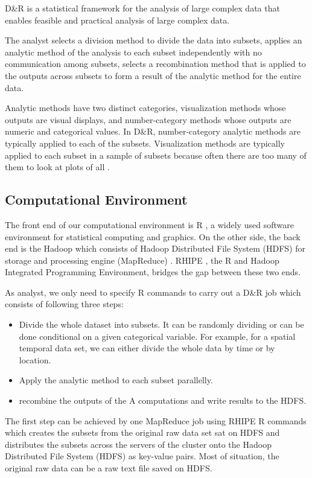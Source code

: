 D\&R \cite{Guha:2012} is a statistical framework for the analysis of large complex
data that enables feasible and practical analysis of large complex data. 

The 
analyst selects a division method to divide the data into subsets, applies an 
analytic method of the analysis to each subset independently with no communication
among subsets, selects a recombination method that is applied to the outputs 
across subsets to form a result of the analytic method for the entire data.

Analytic methods have two distinct categories, visualization methods whose outputs
are visual displays, and number-category methods whose outputs are numeric and 
categorical values. In D\&R, number-category analytic methods are typically applied
to each of the subsets. Visualization methods are typically applied to each subset 
in a sample of subsets because often there are too many of them to look at plots 
of all \cite{Hafen:2013}.
 
\subsection{Computational Environment}

The front end of our computational environment is R \cite{R}, a widely used 
software environment for statistical computing and graphics. On the other side, the
back end is the Hadoop which consists of Hadoop Distributed File 
System (HDFS) \cite{HDFS} for storage and processing engine (MapReduce) 
\cite{mapreduce}. RHIPE \cite{Guha:2010}, the R and Hadoop Integrated Programming 
Environment, bridges the gap between these two ends. 

As analyst, we only need to specify R commands to carry out a D\&R job which
consists of following three steps:
\begin{itemize}
\item Divide the whole dataset into subsets. It can be randomly dividing or
can be done conditional on a given categorical variable. For example, for a spatial
temporal data set, we can either divide the whole data by time or by location. 
\item Apply the analytic method to each subset parallelly.   
\item recombine the outputs of the A computations and write results to the HDFS. 
\end{itemize}  

The first step can be achieved by one MapReduce job using RHIPE R commands which 
creates the subsets from the original raw data set sat on HDFS and 
distributes the subsets across the servers of the cluster onto the Hadoop 
Distributed File System (HDFS) as key-value pairs. Most of situation, the original
raw data can be a raw text file saved on HDFS.

